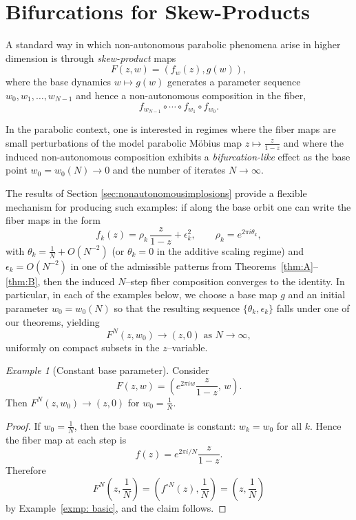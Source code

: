 \documentclass{amsart}
\theoremstyle{remark}
\newtheorem{exmp}{Example}
\theoremstyle{definition}
\begin{document}
    




\section{Bifurcations for Skew-Products}\label{sec:bifurcationsforskew-products}
A standard way in which non-autonomous parabolic phenomena arise in higher dimension is through \emph{skew-product} maps
\[
F(z,w)=(f_w(z),g(w)),
\]
where the base dynamics $w\mapsto g(w)$ generates a parameter sequence
\(
w_0,w_1,\dots,w_{N-1}
\)
and hence a non-autonomous composition in the fiber,
\[
f_{w_{N-1}}\circ \cdots \circ f_{w_1}\circ f_{w_0}.
\]

In the parabolic context, one is interested in regimes where the fiber maps are small perturbations of the model parabolic M\"obius map
\(
z\mapsto \frac{z}{1-z}
\)
and where the induced non-autonomous composition exhibits a \emph{bifurcation-like} effect as the base point $w_0=w_0(N)\to 0$ and the number of iterates $N\to\infty$.

The results of Section \ref{sec:nonautonomousimplosions} provide a flexible mechanism for producing such examples: if along the base orbit one can write the fiber maps in the form
\[
f_k(z)=\rho_k\,\frac{z}{1-z}+\epsilon_k^2,
\qquad \rho_k=e^{2\pi i\theta_k},
\]
with $\theta_k=\frac{1}{N}+O(N^{-2})$ (or $\theta_k=0$ in the additive scaling regime) and $\epsilon_k=O(N^{-2})$ in one of the admissible patterns from Theorems~\ref{thm:A}--\ref{thm:B}, then the induced $N$--step fiber composition converges to the identity. 
In particular, in each of the examples below, we choose a base map $g$ and an initial parameter $w_0=w_0(N)$ so that the resulting sequence $\{\theta_k,\epsilon_k\}$ falls under one of our theorems, yielding
\[
F^{N}(z,w_0)\longrightarrow (z,0)
 \text{ as }N\to\infty,
\]
uniformly on compact subsets in the $z$--variable.

\begin{exmp}[Constant base parameter]
Consider
\[
F(z,w)=\left(e^{2\pi i w}\frac{z}{1-z},\,w\right).
\]
Then $F^{N}(z,w_0)\to (z,0)$ for $w_0=\frac{1}{N}$.
\end{exmp}

\begin{proof}
If $w_0=\frac{1}{N}$, then the base coordinate is constant: $w_k=w_0$ for all $k$. Hence the fiber map at each step is
\[
f(z)=e^{2\pi i/N}\frac{z}{1-z}.
\]
Therefore
\[
F^N\!\left(z,\frac{1}{N}\right)=\left(f^{\circ N}(z),\frac{1}{N}\right)=\left(z,\frac{1}{N}\right)
\]
by Example~\ref{exmp: basic}, and the claim follows.
\end{proof}
\end{document}
